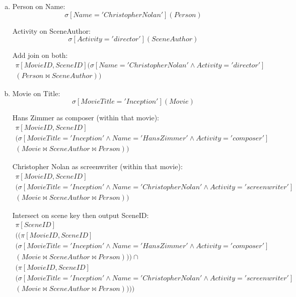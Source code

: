 \documentclass{article}
\begin{document}
\begin{enumerate}[(a)]
\item 
Person on Name:
\begin{equation}
\sigma\left[Name='Christopher Nolan'\right](Person)
\end{equation}

Activity on SceneAuthor:
\begin{equation}
\sigma\left[Activity='director'\right](SceneAuthor)
\end{equation}

Add join on both:
\begin{multline}
\pi\left[MovieID,SceneID\right](\sigma\left[Name='Christopher Nolan' \land Activity='director'\right]\\
 (Person \Join SceneAuthor))
\end{multline}

\item
Movie on Title:
\begin{equation}
\sigma[MovieTitle='Inception'](Movie)
\end{equation}

Hans Zimmer as composer (within that movie):
\begin{multline}
\pi\left[MovieID,SceneID\right]\\
 (\sigma\left[MovieTitle='Inception' \land Name='Hans Zimmer' \land Activity='composer'\right]\\
 (Movie \Join SceneAuthor \Join Person))
\end{multline}

Christopher Nolan as screenwriter (within that movie):
\begin{multline}
\pi\left[MovieID,SceneID\right]\\
 (\sigma\left[MovieTitle='Inception' \land Name='Christopher Nolan' \land Activity='screenwriter'\right]\\
 (Movie \Join SceneAuthor \Join Person))
\end{multline}

Intersect on scene key then output SceneID:
\begin{multline}
\pi\left[SceneID\right]\\
((\pi\left[MovieID,SceneID\right]\\
 (\sigma\left[MovieTitle='Inception' \land Name='Hans Zimmer' \land Activity='composer'\right]\\
 (Movie \Join SceneAuthor \Join Person))) \cap \\
 (\pi\left[MovieID,SceneID\right]\\
 (\sigma\left[MovieTitle='Inception' \land Name='Christopher Nolan' \land Activity='screenwriter'\right]\\
 (Movie \Join SceneAuthor \Join Person))))
\end{multline}


\end{enumerate}
\end{document}
